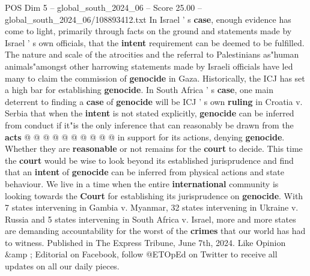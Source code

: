 \begin{textsample}{POS Dim 5 – global\_south\_2024\_06 – Score 25.00 – global\_south\_2024\_06/108893412.txt}
In Israel ' s \textbf{case}, enough evidence has come to light, primarily through facts on the ground and statements made by Israel ' s own officials, that the \textbf{intent} requirement can be deemed to be fulfilled.
The nature and scale of the atrocities and the referral to Palestinians as"human animals"amongst other harrowing statements made by Israeli officials have led many to claim the commission of \textbf{genocide} in Gaza.
Historically, the ICJ has set a high bar for establishing \textbf{genocide}.
In South Africa ' s \textbf{case}, one main deterrent to finding a \textbf{case} of \textbf{genocide} will be ICJ ' s own \textbf{ruling} in Croatia v.
Serbia that when the \textbf{intent} is not stated explicitly, \textbf{genocide} can be inferred from conduct if it"is the only inference that can reasonably be drawn from the \textbf{acts} @ @ @ @ @ @ @ @ @ @ in support for its actions, denying \textbf{genocide}.
Whether they are \textbf{reasonable} or not remains for the \textbf{court} to decide.
This time the \textbf{court} would be wise to look beyond its established jurisprudence and find that an \textbf{intent} of \textbf{genocide} can be inferred from physical actions and state behaviour.
We live in a time when the entire \textbf{international} community is looking towards the \textbf{Court} for establishing its jurisprudence on \textbf{genocide}.
With 7 states intervening in Gambia v.
Myanmar, 32 states intervening in Ukraine v.
Russia and 5 states intervening in South Africa v.
Israel, more and more states are demanding accountability for the worst of the \textbf{crimes} that our world has had to witness.
Published in The Express Tribune, June 7th, 2024.
Like Opinion \&amp ; Editorial on Facebook, follow @ETOpEd on Twitter to receive all updates on all our daily pieces.

\end{textsample}
